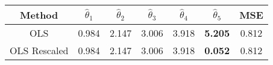 \begin{tabular}{|c|cccccc|}
  \hline
\textbf{Method} & \( \hat{\theta}_1 \) & \( \hat{\theta}_2 \) & \( \hat{\theta}_3 \) & \( \hat{\theta}_4 \) & \( \hat{\theta}_5 \) & MSE \\ \hline
 OLS & 0.984 & 2.147 & 3.006 & 3.918 & \textbf{5.205} & 0.812 \\ 
  OLS Rescaled & 0.984 & 2.147 & 3.006 & 3.918 & \textbf{0.052} & 0.812 \\ 
   \hline
\end{tabular}
